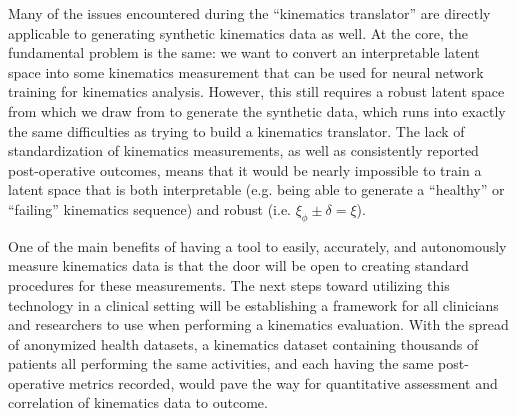 Many of the issues encountered during the ``kinematics translator'' are directly applicable to generating synthetic kinematics data as well.
At the core, the fundamental problem is the same: we want to convert an interpretable latent space into some kinematics measurement that can be used for neural network training for kinematics analysis.
However, this still requires a robust latent space from which we draw from to generate the synthetic data, which runs into exactly the same difficulties as trying to build a kinematics translator.
The lack of standardization of kinematics measurements, as well as consistently reported post-operative outcomes, means that it would be nearly impossible to train a latent space that is both interpretable (e.g. being able to generate a ``healthy'' or ``failing'' kinematics sequence) and robust (i.e. $\xi_{\phi} \pm \delta = \xi$).

One of the main benefits of having a tool to easily, accurately, and autonomously measure kinematics data is that the door will be open to creating standard procedures for these measurements.
The next steps toward utilizing this technology in a clinical setting will be establishing a framework for all clinicians and researchers to use when performing a kinematics evaluation.
With the spread of anonymized health datasets, a kinematics dataset containing thousands of patients all performing the same activities, and each having the same post-operative metrics recorded, would pave the way for quantitative assessment and correlation of kinematics data to outcome.

